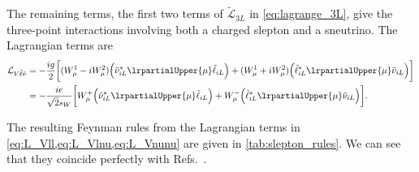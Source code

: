 The remaining terms, the first two terms of $\tilde{\mathcal{L}}_{3L}$ in \cref{eq:lagrange_3L}, give the three-point interactions involving both a charged slepton and a sneutrino. The Lagrangian terms are
\begin{align}
    \mathcal{L}_{V\tilde\ell\tilde\nu} &= -\frac{ig}{2} \biggl[
        (W^1_\mu-iW^2_\mu) \Bigl( \tilde\nu_{iL}^* \lrpartialUpper{\mu} \tilde\ell_{iL} \Bigr)
        + (W^1_\mu + iW^2_\mu) \Bigl( \tilde\ell_{iL}^* \lrpartialUpper{\mu} \tilde\nu_{iL} \Bigr)
    \biggr]
    \nonumber
    \\
    &= -\frac{ie}{\sqrt{2}s_W} \biggl[
        W^+_\mu \Bigl( \tilde\nu_{iL}^* \lrpartialUpper{\mu} \tilde\ell_{iL} \Bigr)
        + W^-_\mu \Bigl( \tilde\ell_{iL}^* \lrpartialUpper{\mu} \tilde\nu_{iL} \Bigr)
    \biggr].
    \label{eq:L_Vlnu}
\end{align}

The resulting Feynman rules from the Lagrangian terms in \cref{eq:L_Vll,eq:L_Vlnu,eq:L_Vnunu} are given in \cref{tab:slepton_rules}.
We can see that they coincide perfectly with Refs.~\cite{Richardson:2000nt,Rosiek:1989sce}.

